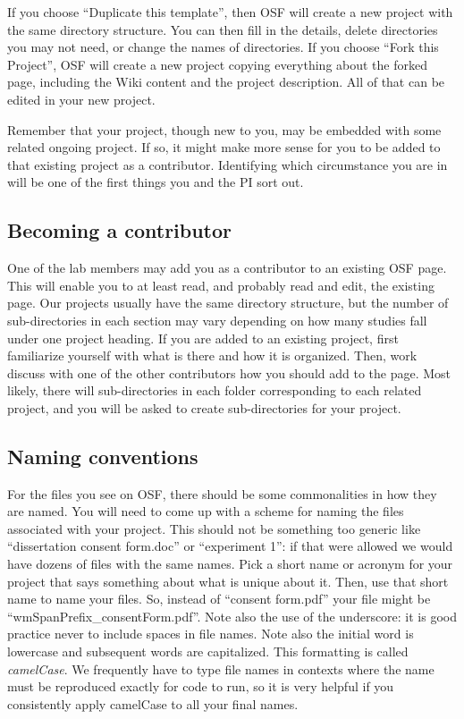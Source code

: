 \documentclass[12pt,]{book}
\theoremstyle{definition}
\theoremstyle{definition}
\theoremstyle{definition}
\theoremstyle{remark}
\begin{document}
If you choose ``Duplicate this template'', then OSF will create a new
project with the same directory structure. You can then fill in the
details, delete directories you may not need, or change the names of
directories. If you choose ``Fork this Project'', OSF will create a new
project copying everything about the forked page, including the Wiki
content and the project description. All of that can be edited in your
new project.

Remember that your project, though new to you, may be embedded with some
related ongoing project. If so, it might make more sense for you to be
added to that existing project as a contributor. Identifying which
circumstance you are in will be one of the first things you and the PI
sort out.

\subsection{Becoming a contributor}\label{becoming-a-contributor}

One of the lab members may add you as a contributor to an existing OSF
page. This will enable you to at least read, and probably read and edit,
the existing page. Our projects usually have the same directory
structure, but the number of sub-directories in each section may vary
depending on how many studies fall under one project heading. If you are
added to an existing project, first familiarize yourself with what is
there and how it is organized. Then, work discuss with one of the other
contributors how you should add to the page. Most likely, there will
sub-directories in each folder corresponding to each related project,
and you will be asked to create sub-directories for your project.

\subsection{Naming conventions}\label{naming-conventions}

For the files you see on OSF, there should be some commonalities in how
they are named. You will need to come up with a scheme for naming the
files associated with your project. This should not be something too
generic like ``dissertation consent form.doc'' or ``experiment 1'': if
that were allowed we would have dozens of files with the same names.
Pick a short name or acronym for your project that says something about
what is unique about it. Then, use that short name to name your files.
So, instead of ``consent form.pdf'' your file might be
``wmSpanPrefix\_consentForm.pdf''. Note also the use of the underscore:
it is good practice never to include spaces in file names. Note also the
initial word is lowercase and subsequent words are capitalized. This
formatting is called \emph{camelCase}. We frequently have to type file
names in contexts where the name must be reproduced exactly for code to
run, so it is very helpful if you consistently apply camelCase to all
your final names.
\end{document}

